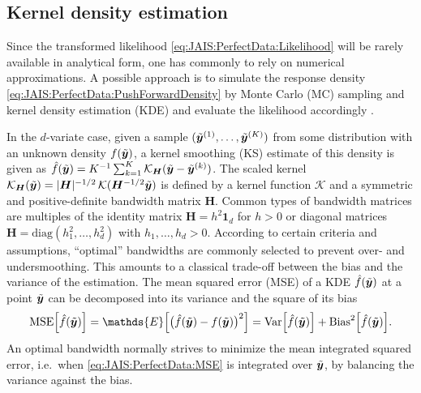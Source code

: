 \subsection{Kernel density estimation}
Since the transformed likelihood \cref{eq:JAIS:PerfectData:Likelihood} will be rarely available in analytical form, one has commonly to rely on numerical approximations.
A possible approach is to simulate the response density \cref{eq:JAIS:PerfectData:PushForwardDensity} by Monte Carlo (MC) sampling and kernel density estimation (KDE) \cite{Statistics:Silverman1986,Statistics:Wand1994}
and evaluate the likelihood accordingly \cite{PCE:Sudret2007,PCE:Sudret2008:a:Proc}.
\par %
In the \(d\)-variate case, given a sample \((\tilde{\bm{y}}^{(1)},\ldots,\tilde{\bm{y}}^{(K)})\) from some distribution with an unknown density \(f(\tilde{\bm{y}})\),
a kernel smoothing (KS) estimate of this density is given as \(\hat{f}(\tilde{\bm{y}}) = K^{-1} \sum_{k=1}^K \mathcal{K}_{\bm{H}} (\tilde{\bm{y}}-\tilde{\bm{y}}^{(k)})\).
The scaled kernel \(\mathcal{K}_{\bm{H}}(\tilde{\bm{y}}) = \lvert \bm{H} \rvert^{-1/2} \, \mathcal{K} (\bm{H}^{-1/2} \tilde{\bm{y}})\)
is defined by a kernel function \(\mathcal{K}\) and a symmetric and positive-definite bandwidth matrix \(\bm{H}\).
Common types of bandwidth matrices are multiples of the identity matrix \(\bm{H} = h^2 \bm{1}_d\) for \(h>0\) or diagonal matrices \(\bm{H} = \mathrm{diag}(h_1^2,\ldots,h_d^2)\) with \(h_1,\ldots,h_d>0\). 
According to certain criteria and assumptions, ``optimal'' bandwidths are commonly selected to prevent over- and undersmoothing.
This amounts to a classical trade-off between the bias and the variance of the estimation.
The mean squared error (MSE) of a KDE \(\hat{f}(\tilde{\bm{y}})\) at a point \(\tilde{\bm{y}}\) can be decomposed into its variance and the square of its bias
\begin{equation} \label{eq:JAIS:PerfectData:MSE}
  \mathrm{MSE} \Big[ \hat{f}(\perfect{\bm{y}}) \Big] = \mathds{E} \Big[ \big( \hat{f}(\perfect{\bm{y}}) - f(\perfect{\bm{y}}) \big)^2 \Big]
  = \mathrm{Var} \Big[ \hat{f}(\perfect{\bm{y}}) \Big] + \mathrm{Bias}^2 \Big[ \hat{f}(\perfect{\bm{y}}) \Big].
\end{equation}
An optimal bandwidth normally strives to minimize the mean integrated squared error, i.e.\ when \cref{eq:JAIS:PerfectData:MSE} is integrated over \(\tilde{\bm{y}}\), by balancing the variance against the bias.
